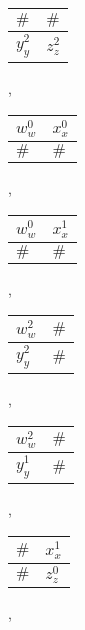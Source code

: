 \begin{example}
\begin{compactitem}
\begin{tabular}{|C{0.95cm}|C{0.95cm}|}
\hline
 \hspace{0.1cm}$\#$\hspace{0.1cm} & \hspace{0.1cm}$\#$\hspace{0.1cm} \tabularnewline
\hline
 $y_{y}^{2}$ & $z_{z}^{2}$ \tabularnewline
\hline
\end{tabular},
\begin{tabular}{|C{0.95cm}|C{0.95cm}|}
\hline
 $w_{w}^{0}$ & $x_{x}^{0}$ \tabularnewline
\hline
 \hspace{0.1cm}$\#$\hspace{0.1cm} & \hspace{0.1cm}$\#$\hspace{0.1cm} \tabularnewline
\hline
\end{tabular},
\begin{tabular}{|C{0.95cm}|C{0.95cm}|}
\hline
 $w_{w}^{0}$ & $x_{x}^{1}$ \tabularnewline
\hline
 \hspace{0.1cm}$\#$\hspace{0.1cm} & \hspace{0.1cm}$\#$\hspace{0.1cm} \tabularnewline
\hline
\end{tabular},
\begin{tabular}{|C{0.95cm}|C{0.95cm}|}
\hline
 $w_{w}^{2}$ & \hspace{0.1cm}$\#$\hspace{0.1cm} \tabularnewline
\hline
 \hspace{0.08cm}$y_{y}^{2}$\hspace{0.08cm} & $\#$ \tabularnewline
\hline
\end{tabular},
\begin{tabular}{|C{0.95cm}|C{0.95cm}|}
\hline
 $w_{w}^{2}$ & \hspace{0.1cm}$\#$\hspace{0.1cm} \tabularnewline
\hline
 \hspace{0.08cm}$y_{y}^{1}$\hspace{0.08cm} & $\#$\tabularnewline
\hline
\end{tabular},
\begin{tabular}{|C{0.95cm}|C{0.95cm}|}
\hline
 \hspace{0.1cm}$\#$\hspace{0.1cm} & \hspace{0.07cm}$x_{x}^{1}$\hspace{0.07cm} \tabularnewline
\hline
 $\#$ & $z_{z}^{0}$ \tabularnewline
\hline
\end{tabular},


\end{compactitem}
\end{example}
